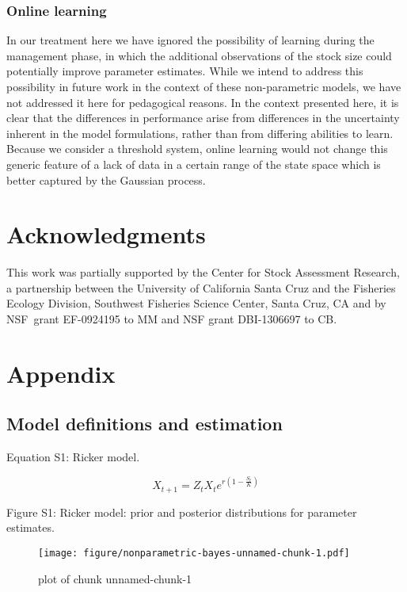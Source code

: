 \documentclass[author-year, review]{elsarticle} %
\makeatletter
\def\maxwidth{\ifdim\Gin@nat@width>\linewidth\linewidth
\else\Gin@nat@width\fi}
\let\Oldincludegraphics\includegraphics
\renewcommand{\includegraphics}[1]{\Oldincludegraphics[width=\maxwidth]{#1}}
\makeatother
\begin{document}
\subsubsection{Online learning}\label{online-learning}

In our treatment here we have ignored the possibility of learning during
the management phase, in which the additional observations of the stock
size could potentially improve parameter estimates. While we intend to
address this possibility in future work in the context of these
non-parametric models, we have not addressed it here for pedagogical
reasons. In the context presented here, it is clear that the differences
in performance arise from differences in the uncertainty inherent in the
model formulations, rather than from differing abilities to learn.
Because we consider a threshold system, online learning would not change
this generic feature of a lack of data in a certain range of the state
space which is better captured by the Gaussian process.

\section{Acknowledgments}\label{acknowledgments}

This work was partially supported by the Center for Stock Assessment
Research, a partnership between the University of California Santa Cruz
and the Fisheries Ecology Division, Southwest Fisheries Science Center,
Santa Cruz, CA and by NSF~grant EF-0924195 to MM and NSF grant
DBI-1306697 to CB.

\section{Appendix}\label{appendix}

\subsection{Model definitions and
estimation}\label{model-definitions-and-estimation}

Equation S1: Ricker model.

\[X_{t+1} = Z_t X_t e^{r \left(1 - \frac{S_t}{K} \right) } \]

Figure S1: Ricker model: prior and posterior distributions for parameter
estimates.

\begin{figure}[htbp]
\centering
\texttt{[image: figure/nonparametric-bayes-unnamed-chunk-1.pdf]}
\caption{plot of chunk unnamed-chunk-1}
\end{figure}
\end{document}
